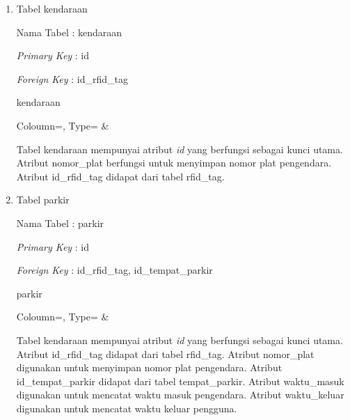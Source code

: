 \begin{enumerate}[topsep=0pt,itemsep=0pt,partopsep=0pt, parsep=0pt]
    \item Tabel kendaraan

    Nama Tabel : kendaraan

    \textit{Primary Key} : id

    \textit{Foreign Key} : id\_rfid\_tag

    \begin{table} [H]
        \centering 
        \caption{kendaraan}
        \label{table:db_kendaraan}
            {
                Coloumn=\Coloumn, 
                Type=\Type}
            {
                \Coloumn & 
                \Type}
    \end{table}

    Tabel kendaraan mempunyai atribut \textit{id} yang berfungsi sebagai kunci utama. Atribut nomor\_plat berfungsi untuk menyimpan nomor plat pengendara. Atribut id\_rfid\_tag didapat dari tabel rfid\_tag.

    \item Tabel parkir

    Nama Tabel : parkir

    \textit{Primary Key} : id

    \textit{Foreign Key} : id\_rfid\_tag, id\_tempat\_parkir

    \begin{table} [H]
        \centering
        \caption{parkir}
        \label{table:db_parkir}
            {
                Coloumn=\Coloumn, 
                Type=\Type}
            {
                \Coloumn & 
                \Type}
    \end{table}

    Tabel kendaraan mempunyai atribut \textit{id} yang berfungsi sebagai kunci utama. Atribut id\_rfid\_tag didapat dari tabel rfid\_tag. Atribut nomor\_plat digunakan untuk menyimpan nomor plat pengendara. Atribut id\_tempat\_parkir didapat dari tabel tempat\_parkir. Atribut waktu\_masuk digunakan untuk mencatat waktu masuk pengendara. Atribut waktu\_keluar digunakan untuk mencatat waktu keluar pengguna.


\end{enumerate}
